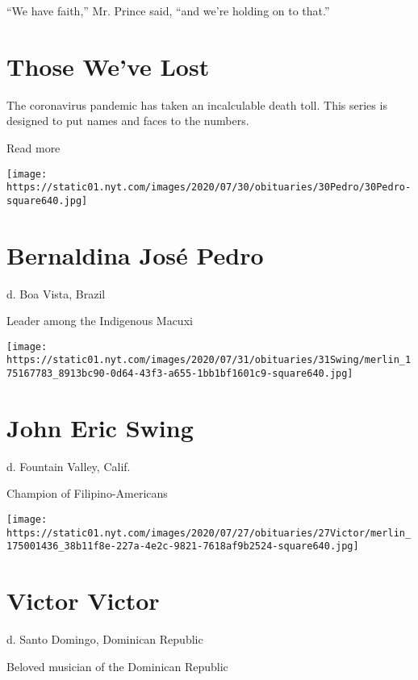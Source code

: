 ``We have faith,'' Mr. Prince said, ``and we're holding on to that.''

\href{https://www.nytimes.com/interactive/2020/obituaries/people-died-coronavirus-obituaries.html?action=click\&pgtype=Article\&state=default\&region=BELOW_MAIN_CONTENT\&context=covid_obits_promo}{}

\hypertarget{those-weve-lost}{%
\section{Those We've Lost}\label{those-weve-lost}}

The coronavirus pandemic has taken an incalculable death toll. This
series is designed to put names and faces to the numbers.

Read more

\texttt{[image: https://static01.nyt.com/images/2020/07/30/obituaries/30Pedro/30Pedro-square640.jpg]}

\hypertarget{bernaldina-josuxe9-pedro}{%
\section{Bernaldina José Pedro}\label{bernaldina-josuxe9-pedro}}

d. Boa Vista, Brazil

Leader among the Indigenous Macuxi

\texttt{[image: https://static01.nyt.com/images/2020/07/31/obituaries/31Swing/merlin\_175167783\_8913bc90-0d64-43f3-a655-1bb1bf1601c9-square640.jpg]}

\hypertarget{john-eric-swing}{%
\section{John Eric Swing}\label{john-eric-swing}}

d. Fountain Valley, Calif.

Champion of Filipino-Americans

\texttt{[image: https://static01.nyt.com/images/2020/07/27/obituaries/27Victor/merlin\_175001436\_38b11f8e-227a-4e2c-9821-7618af9b2524-square640.jpg]}

\hypertarget{victor-victor}{%
\section{Victor Victor}\label{victor-victor}}

d. Santo Domingo, Dominican Republic

Beloved musician of the Dominican Republic

